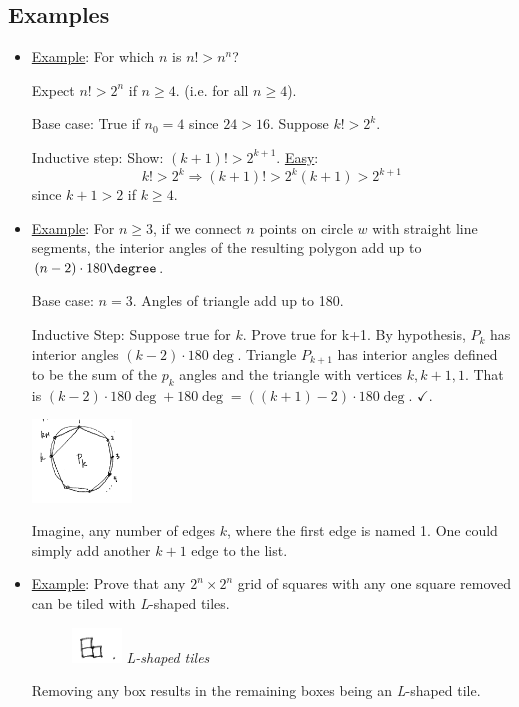 \documentclass[12pt]{article}
\begin{document}
\subsection{Examples}
\label{sec:org39b181a}
\begin{itemize}
\item \uline{Example}: For which \(n\) is \(n!>n^{n}\)?

Expect \(n!>2^n\) if \(n\ge{}4\). (i.e. for all \(n\ge{}4\)).

Base case: True if \(n_{0}=4\) since \(24>16\). Suppose \(k!>2^{k}\). 

Inductive step: Show: \((k+1)!>2^{k+1}\). \uline{Easy}: $$k!>2^{k} \Rightarrow
    (k+1)!>2^{k}(k+1)>2^{k+1}$$ since \(k+1>2\) if \(k\ge{}4\).

\item \uline{Example}: For \(n\ge3\), if we connect \(n\) points on circle \(w\) with straight
line segments, the interior angles of the resulting polygon add up to
\((n-2)\cdot180\degree\).

Base case: \(n=3\). Angles of triangle add up to 180\textdegree{}. 

Inductive Step: Suppose true for \(k\). Prove true for k+1. By hypothesis,
\(P_{k}\) has interior angles \((k-2)\cdot180\deg\). Triangle \(P_{k+1}\) has
interior angles defined to be the sum of the \(p_{k}\) angles and the triangle
with vertices \(k, k+1, 1\). That is \((k-2)\cdot180\deg + 180\deg =
    ((k+1)-2)\cdot180\deg\). \(\checkmark\).

\begin{center}
\includegraphics[width=100]{Midterm two/screenshot_2017-03-03_16-17-22.png}
\end{center} Imagine, any number of
edges \(k\), where the first edge is named 1. One could simply add another
\(k+1\) edge to the list.

\item \uline{Example}: Prove that any \(2^n\times2^n\) grid of squares with any one
square removed can be tiled with \emph{L}-shaped tiles.

\begin{figure}[htbp]
\centering
\includegraphics[width=50]{Midterm two/screenshot_2017-03-03_15-48-14.png}
\Leftarrow\textit{L-shaped tiles}
\end{figure} Removing any box
results in the remaining boxes being an \emph{L}-shaped tile.


\end{itemize}
\end{document}
